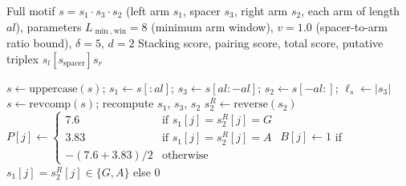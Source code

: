 \documentclass{article}
\begin{document}
\begin{algorithm}
\caption{HSeeker Phase 3: Thermodynamic Stability Scoring}
\label{alg:mirror-phase3}
\scriptsize
\begin{algorithmic}[1]
\Require Full motif $s = s_1 \cdot s_3 \cdot s_2$ (left arm $s_1$, spacer $s_3$,
         right arm $s_2$, each arm of length $al$),
         parameters $L_{\min,\mathrm{win}} = 8$ (minimum arm window),
         $v = 1.0$ (spacer-to-arm ratio bound),
         $\delta = 5$, $d = 2$
\Ensure Stacking score, pairing score, total score,
        putative triplex $s_l[s_{\mathrm{spacer}}]s_r$

\State $s \leftarrow \mathrm{uppercase}(s)$;\;
       $s_1 \leftarrow s[{:}al]$;\;
       $s_3 \leftarrow s[al{:}-al]$;\;
       $s_2 \leftarrow s[-al{:}]$;\;
       $\ell_s \leftarrow |s_3|$
    \State $s \leftarrow \mathrm{revcomp}(s)$;\; recompute $s_1,\, s_3,\, s_2$
\EndIf
\State $s_2^R \leftarrow \mathrm{reverse}(s_2)$
    \State $P[j] \leftarrow
        \begin{cases}
            7.6   & \text{if } s_1[j] = s_2^R[j] = G\\
            3.83  & \text{if } s_1[j] = s_2^R[j] = A\\
            -(7.6+3.83)/2 & \text{otherwise}
        \end{cases}$
    \State $B[j] \leftarrow 1$ if $s_1[j] = s_2^R[j] \in \{G,A\}$ else $0$
\EndFor


\end{algorithmic}
\end{algorithm}
\end{document}
